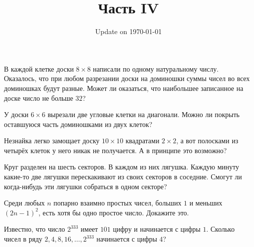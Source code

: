 \documentclass[12pt]{article}
\begin{document}
\fontsize{12}{12}\selectfont

\title{\bf \huge Часть IV}
\date{Update on \today}
\maketitle 

\begin{task}
В каждой клетке доски $8 \times 8$ написали по одному натуральному числу. Оказалось, что при любом разрезании доски на доминошки суммы чисел во всех доминошках будут разные. Может ли оказаться, что наибольшее записанное на доске число не больше $32$?
\end{task}

\begin{task}
У доски $6 \times 6$ вырезали две угловые клетки на диагонали. Можно ли покрыть оставшуюся часть доминошками из двух клеток?
\end{task}

\begin{task}
Незнайка легко замощает доску $10 \times 10$ квадратами $2 \times 2$, а вот полосками из четырёх клеток у него никак не получается. А в принципе это возможно?
\end{task}

\begin{task}
Круг разделен на шесть секторов. В каждом из них лягушка. Каждую минуту какие-то две лягушки перескакивают из своих секторов в соседние. Смогут ли когда-нибудь эти лягушки собраться в одном секторе? 
\end{task}

\begin{task}
Среди любых $n$ попарно взаимно простых чисел, больших $1$ и меньших $(2n - 1)^{2}$, есть хотя бы одно простое число. Докажите это.
\end{task}

\begin{task}
Известно, что число $2^{333}$ имеет $101$ цифру и начинается с цифры $1$. Сколько чисел в ряду $2, 4, 8, 16, \dots, 2^{333}$ начинается с цифры $4$? 
\end{task}
\end{document}
